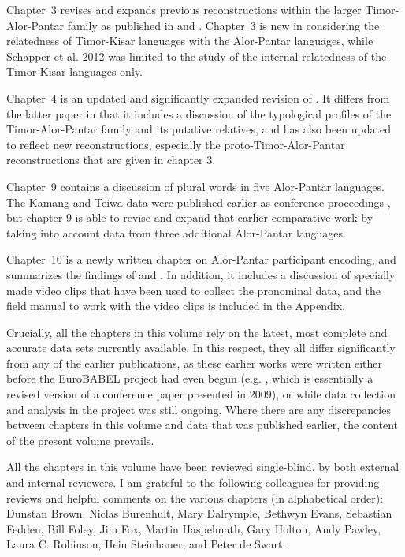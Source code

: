 \documentclass[output=paper]{LSP/langsci}
\begin{document}
Chapter~3 revises and expands previous reconstructions within the larger Ti\-mor-Alor-Pantar family as published in \citet{HoltonEtAl2012} and \citet{SchapperEtAl2012}. Chapter~3 is new in considering the relatedness of Timor-Kisar languages with the Alor-Pantar languages, while Schapper et al. 2012 was limited to the study of the internal relatedness of the Timor-Kisar languages only.

Chapter~4 is an updated and significantly expanded revision of \citet{RobinsonEtAl2012reassessing}. It differs from the latter paper in that it includes a discussion of the typological profiles of the Timor-Alor-Pantar family and its putative relatives, and has also been updated to reflect new reconstructions, especially the proto-Timor-Alor-Pantar reconstructions that are given in chapter 3. 

Chapter~9 contains a discussion of plural words in five Alor-Pantar languages. The Kamang and Teiwa data were published earlier as conference proceedings \citep{SchapperEtAl2011plural}, but chapter 9 is able to revise and expand that earlier comparative work by taking into account data from three additional Alor-Pantar languages.

Chapter~10 is a newly written chapter on Alor-Pantar participant encoding, and summarizes the findings of \citet{FeddenEtAl2013} and \citet{FeddenEtAl2014}. In addition, it includes a discussion of specially made video clips that have been used to collect the pronominal data, and the field manual to work with the video clips is included in the Appendix.

Crucially, all the chapters in this volume rely on the latest, most complete and accurate data sets currently available. In this respect, they all differ significantly from any of the earlier publications, as these earlier works were written either before the EuroBABEL project had even begun (e.g. \citet{HoltonEtAl2012}, which is essentially a revised version of a conference paper presented in 2009), or while data collection and analysis in the project was still ongoing. Where there are any discrepancies between chapters in this volume and data that was published earlier, the content of the present volume prevails.

All the chapters in this volume have been reviewed single-blind, by both external and internal reviewers. I am grateful to the following colleagues for providing reviews and helpful comments on the various chapters (in alphabetical order): Dunstan Brown, Niclas Burenhult, Mary Dalrymple, Bethwyn Evans, Sebastian Fedden, Bill Foley, Jim Fox, Martin Haspelmath, Gary Holton, Andy Pawley, Laura C. Robinson, Hein Steinhauer, and Peter de Swart.
	
\end{document}
